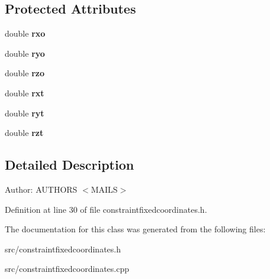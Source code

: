 \subsection*{Protected Attributes}
\begin{CompactItemize}
\item 
\hypertarget{classmknix_1_1ConstraintFixedCoordinates_07324acb35594ed9274bc8b79ca356c1}{
double \textbf{rxo}}
\label{classmknix_1_1ConstraintFixedCoordinates_07324acb35594ed9274bc8b79ca356c1}

\item 
\hypertarget{classmknix_1_1ConstraintFixedCoordinates_1e5c7b99aad5c0c1752d3fa5154ff77e}{
double \textbf{ryo}}
\label{classmknix_1_1ConstraintFixedCoordinates_1e5c7b99aad5c0c1752d3fa5154ff77e}

\item 
\hypertarget{classmknix_1_1ConstraintFixedCoordinates_1e43b5f72d8064762f0427204f46b3a1}{
double \textbf{rzo}}
\label{classmknix_1_1ConstraintFixedCoordinates_1e43b5f72d8064762f0427204f46b3a1}

\item 
\hypertarget{classmknix_1_1ConstraintFixedCoordinates_fb8e43d7544941154e51c93e0662ef93}{
double \textbf{rxt}}
\label{classmknix_1_1ConstraintFixedCoordinates_fb8e43d7544941154e51c93e0662ef93}

\item 
\hypertarget{classmknix_1_1ConstraintFixedCoordinates_de68140fb4d4f9e0cb0d2996274e222a}{
double \textbf{ryt}}
\label{classmknix_1_1ConstraintFixedCoordinates_de68140fb4d4f9e0cb0d2996274e222a}

\item 
\hypertarget{classmknix_1_1ConstraintFixedCoordinates_45657121be64f04cf1667a9090ba6451}{
double \textbf{rzt}}
\label{classmknix_1_1ConstraintFixedCoordinates_45657121be64f04cf1667a9090ba6451}

\end{CompactItemize}


\subsection{Detailed Description}
\begin{Desc}
\item[Author:]AUTHORS $<$MAILS$>$ \end{Desc}


Definition at line 30 of file constraintfixedcoordinates.h.

The documentation for this class was generated from the following files:\begin{CompactItemize}
\item 
src/constraintfixedcoordinates.h\item 
src/constraintfixedcoordinates.cpp\end{CompactItemize}
